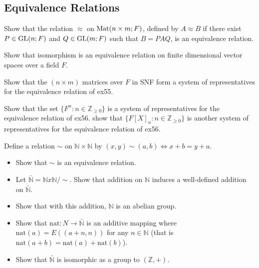 \subsection{Equivalence Relations}
\item Show that the relation $\approx$ on $\text{Mat}(n \times m; F)$, defined by $A \approx B$ if there exist $P \in \text{GL}(n;F)$ and $Q \in \text{GL}(m;F)$ such that $B = PAQ$, is an equivalence relation.
\item Show that isomorphism is an equivalence relation on finite dimensional vector spaces over a field $F$.
\item Show that the $(n \times m)$ matrices over $F$ in SNF form a system of representatives for the equivalence relation of ex55.
\item Show that the set $\{F^n : n \in \mathbb{Z}_{\ge0}\}$ is a system of representatives for the equivalence relation of ex56. show that $\{F[X]_n : n \in \mathbb{Z}_{\ge0}\}$ is another system of representatives for the equivalence relation of ex56.
\item Define a relation $\sim$ on $\mathbb{N}\times\mathbb{N}$ by $(x, y) \sim (a, b) \Leftrightarrow x + b = y + a$.
  \begin{itemize}
  \item Show that $\sim$ is an equivalence relation.
  \item Let $\bar{\mathbb{N}} = \mathbb{N} x \mathbb{N} / \sim$. Show that addition on $\mathbb{N}$ induces a well-defined addition on $\bar{\mathbb{N}}$.
  \item Show that with this addition, $\mathbf{\mathbb{N}}$ is an abelian group.
  \item Show that $\text{nat} : N \to \bar{\mathbb{N}}$ is an additive mapping where $\text{nat}(a) = E((a + n, n))$ for any $n \in \mathbb{N}$ (that is $\text{nat}(a + b) = \text{nat}(a) + \text{nat}(b)$).
  \item Show that $\bar{\mathbb{N}}$ is isomorphic as a group to $(\mathbb{Z}, +)$.
  \end{itemize}